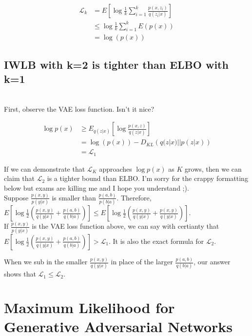 \documentclass{amsart}
\numberwithin{equation}{section}
\theoremstyle{definition}
\theoremstyle{remark}
\begin{document}
\begin{equation}
\begin{split}
\mathcal{L}_k&= E\left[\log \frac{1}{k} \sum_{i=1}^k \frac{p(x,z_i)}{q(z_i|x)} \right] \\
&\leq \log \frac{1}{k} \sum_{i=1}^k E (p(x))\\
&= \log (p(x))
\end{split}
\end{equation}

\subsection{IWLB with k=2 is tighter than ELBO with k=1} \\

First, observe the VAE loss function. Isn't it nice?

\begin{equation}
\begin{split}
\log p(x) &\geq E_{q(z|x)} \left[\log \frac{p(x,z)}{q(z|x)} \right]\\
&= \log (p(x))- D_{KL} \left(q(z|x)|| p(z|x) \right)\\
&= \mathcal{L}_1
\end{split}
\end{equation}

If we can demonstrate that $\mathcal{L}_K$ approaches $\log p(x)$ as $K$ grows, then we can claim that $\mathcal{L}_2$ is a tighter bound than ELBO. I'm sorry for the crappy formatting below but exams are killing me and I hope you understand ;). \\

Suppose $\frac{p(x,y)}{p(y|x)}$ is smaller than $\frac{p(a,b)}{p(b|a)}$.
Therefore, $E \left[\log \frac{1}{2}\left(\frac{p(x,y)}{q(y|x)}+\frac{p(a,b)}{q(b|a)}\right)\right] \leq E \left[\log  \frac{1}{2}\left(\frac{p(x,y)}{q(y|x)}+\frac{p(x,y)}{q(y|x)}\right)\right]$. \\

If $\frac{p(x,y)}{p(y|x)}$ is the VAE loss function above, we can say with certianty that
$E \left[\log \frac{1}{2}\left(\frac{p(x,y)}{q(y|x)}+\frac{p(a,b)}{q(b|a)}\right)\right] >
\mathcal{L}_1$. It is also the exact formula for $\mathcal{L}_2$.

When we sub in the smaller $\frac{p(x,y)}{q(y|x)}$ in place of the 
larger $\frac{p(a,b)}{q(b|a)}$, our answer shows that  $\mathcal{L}_1 \leq \mathcal{L}_2$.\\

\section{Maximum Likelihood for Generative Adversarial Networks} \\
\end{document}

